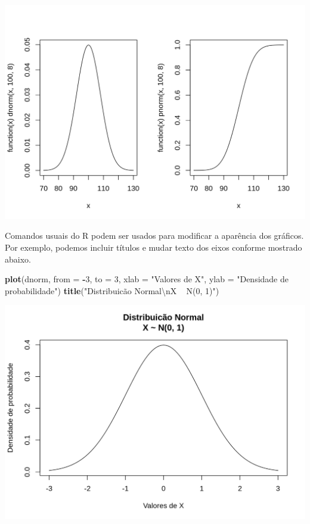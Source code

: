 \documentclass[10pt,a4paper]{book}
\newenvironment{Shaded}{\begin{snugshade}}{\end{snugshade}}
\newcommand{\KeywordTok}[1]{\textcolor[rgb]{0.13,0.29,0.53}{\textbf{#1}}}
\newcommand{\DataTypeTok}[1]{\textcolor[rgb]{0.13,0.29,0.53}{#1}}
\newcommand{\DecValTok}[1]{\textcolor[rgb]{0.00,0.00,0.81}{#1}}
\newcommand{\CharTok}[1]{\textcolor[rgb]{0.31,0.60,0.02}{#1}}
\newcommand{\StringTok}[1]{\textcolor[rgb]{0.31,0.60,0.02}{#1}}
\newcommand{\OperatorTok}[1]{\textcolor[rgb]{0.81,0.36,0.00}{\textbf{#1}}}
\newcommand{\NormalTok}[1]{#1}
\begin{document}
\begin{center}\includegraphics{figures/unnamed-chunk-344-1} \end{center}

Comandos usuais do R podem ser usados para modificar a aparência dos
gráficos. Por exemplo, podemos incluir títulos e mudar texto dos eixos
conforme mostrado abaixo.

\begin{Shaded}
\begin{Highlighting}[]
\KeywordTok{plot}\NormalTok{(dnorm, }\DataTypeTok{from =} \OperatorTok{-}\DecValTok{3}\NormalTok{, }\DataTypeTok{to =} \DecValTok{3}\NormalTok{,}
     \DataTypeTok{xlab =} \StringTok{"Valores de X"}\NormalTok{,}
     \DataTypeTok{ylab =} \StringTok{"Densidade de probabilidade"}\NormalTok{)}
\KeywordTok{title}\NormalTok{(}\StringTok{"Distribuicão Normal}\CharTok{\textbackslash{}n}\StringTok{X ~ N(0, 1)"}\NormalTok{)}
\end{Highlighting}
\end{Shaded}

\begin{center}\includegraphics{figures/unnamed-chunk-345-1} \end{center}
\end{document}
